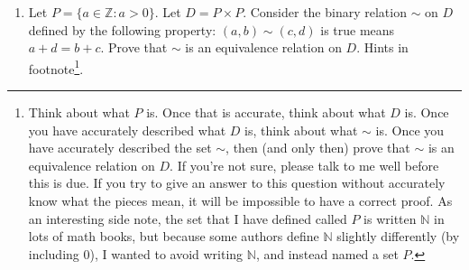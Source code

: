 \documentclass{article}
\begin{document}
\begin{enumerate}

\item Let $P = \{a \in \mathbb{Z} : a > 0\}$. Let $D = P \times P$. Consider the binary relation $\sim$ on $D$ defined by the following property: $(a,b) \sim (c,d)$ is true means $a+d=b+c$. Prove that $\sim$ is an equivalence relation on $D$. Hints in footnote\footnote{Think about what $P$ is. Once that is accurate, think about what $D$ is. Once you have accurately described what $D$ is, think about what $\sim$ is. Once you have accurately described the set $\sim$, then (and only then) prove that $\sim$ is an equivalence relation on $D$. If you're not sure, please talk to me well before this is due. If you try to give an answer to this question without accurately know what the pieces mean, it will be impossible to have a correct proof. As an interesting side note, the set that I have defined called $P$ is written $\mathbb{N}$ in lots of math books, but because some authors define $\mathbb{N}$ slightly differently (by including $0$), I wanted to avoid writing $\mathbb{N}$, and instead named a set $P$.}.

\newpage


\end{enumerate}
\end{document}

